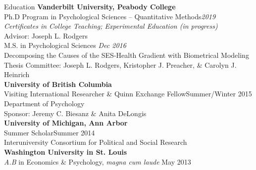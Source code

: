 \begin{rSection}{\textrm{Education}}
{\bf Vanderbilt University, Peabody College}\\
Ph.D Program in Psychological Sciences -- Quantitative Methods\hfill{\em 2019} \\
\hspace*{\pindent}\textit{Certificates in College Teaching; Experimental Education (in progress)}\\
\hspace*{\pindent}Advisor: Joseph L. Rodgers%
\smallskip\\
M.S. in Psychological Sciences \hfill{\em Dec 2016} \\
\hspace*{\pindent}Decomposing the Causes of the SES-Health Gradient with Biometrical Modeling\\
\hspace*{\pindent}Thesis Committee: Joseph L. Rodgers, Kristopher J. Preacher, \& Carolyn J. Heinrich %
\medskip\\
\textbf{University of British Columbia}\\
Visiting International Researcher \& Quinn Exchange Fellow\hfill{Summer/Winter 2015}\\
\hspace*{\pindent}Department of Psychology\\
\hspace*{\pindent}Sponsor: Jeremy C. Biesanz \& Anita DeLongis\medskip\\
\textbf{University of Michigan, Ann Arbor}\\
Summer Scholar\hfill{Summer 2014}\\
\hspace*{\pindent}Interuniversity Consortium for Political and Social Research\medskip\\
{\bf Washington University in St. Louis}\\
{\em A.B} in Economics \& Psychology, \textit{magna cum laude} \hfill{May 2013}%
\end{rSection}
